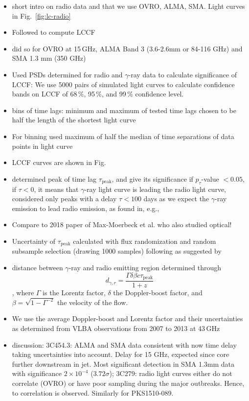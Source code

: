 \documentclass[twocolumn]{aastex62}
\newcommand{\gray}{$\gamma$-ray\xspace}
\begin{document}
\begin{itemize}
    \item short intro on radio data and that we use OVRO, ALMA, SMA. Light curves in Fig.~\ref{fig:lc-radio}
    \item Followed \citet{2014MNRAS.445..437M,2014MNRAS.445..428M} to compute LCCF
    \item did so for OVRO at 15\,GHz, ALMA Band 3 (3.6-2.6mm or 84-116 GHz) and SMA 1.3 mm (350 GHz)
    \item Used PSDs determined for radio and \gray data to calculate significance of LCCF: We use 5000 pairs of simulated light curves to calculate confidence bands on LCCF of 68\,\%, 95\,\%, and 99\,\% confidence level. 
    \item bins of time lags: minimum and maximum of tested time lags chosen to be half the length of the shortest light curve
    \item For binning used maximum of half the median of time separations of data points in light curve
    \item LCCF curves are shown in Fig.
    \item determined peak of time lag $\tau_\mathrm{peak}$, and give its significance if $p_\tau$-value $<0.05$, if $\tau < 0$, it means that \gray light curve is leading the radio light curve, considered only peaks with a delay $\tau < 100$ days as we expect the \gray emission to lead radio emission, as found in, e.g.,~\citet{2014MNRAS.441.1899F}
    \item Compare to 2018 paper of Max-Moerbeck et al. who also studied optical!
    \item Uncertainty of $\tau_\mathrm{peak}$ calculated with flux randomization and random subsample selection (drawing 1000 samples) following \citet{1998PASP..110..660P} as suggested by \citet{2014MNRAS.445..437M}
    \item distance between \gray and radio emitting region determined through
    \begin{equation}
        d_{\gamma,r} = \frac{\Gamma\delta\beta c\tau_\mathrm{peak}}{1 + z}
    \end{equation},
    where $\Gamma$ is the Lorentz factor, $\delta$ the Doppler-boost factor, and $\beta = \sqrt{1 - \Gamma^{-2}}$ the velocity of the flow. 
    \item We use the average Doppler-boost and Lorentz factor and their uncertainties as determined from VLBA observations from 2007 to 2013 at 43\,GHz~\citep{2017ApJ...846...98J}
    \item discussion: 3C454.3: ALMA and SMA data consistent with now time delay taking uncertainties into account. Delay for 15 GHz, expected since core further downstream in jet. Most significant detection in SMA 1.3mm data with significance $2\times10^{-4}$ ($3.72\sigma$); 3C279: radio light curves either do not correlate (OVRO) or have poor sampling during the major outbreaks. Hence, to correlation is observed. Similarly for PKS1510-089. 

\end{itemize}
\end{document}

